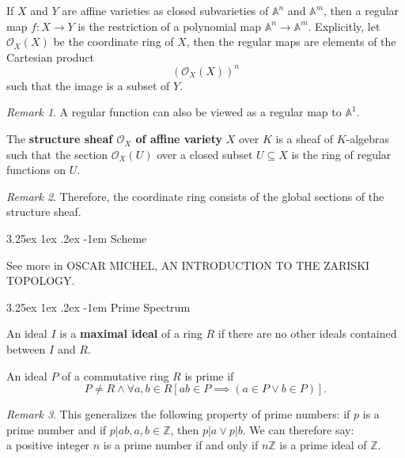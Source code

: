 \documentclass[12pt, letterpaper]{article}
\makeatletter
\renewcommand\subparagraph{\@startsection{subparagraph}{5}{\parindent}%
	{3.25ex \@plus1ex \@minus .2ex}%
	{0.75ex plus 0.1ex}%
	{\normalfont\normalsize\bfseries}}
\newcommand{\inte}{\mathbb{Z}}
\newcommand{\blue}[1]{{\color{blue} #1}}
\renewcommand\paragraph{\@startsection{paragraph}{4}{\z@}%
	{3.25ex \@plus1ex \@minus.2ex}%
	{-1em}%
	{\normalfont\normalsize\bfseries}}
\renewcommand\subparagraph{\@startsection{subparagraph}{5}{\parindent}%
	{3.25ex \@plus1ex \@minus .2ex}%
	{-1em}%
	{\normalfont\normalsize\bfseries}}
\theoremstyle{definition}
\theoremstyle{remark}
\newtheorem*{rem*}{Remark}
\theoremstyle{definition}
\theoremstyle{plain}
\numberwithin{equation}{section}
\makeatother
\begin{document}
	\begin{def*}
		If $X$ and $Y$ are affine varieties as closed subvarieties of
		${\mathbb  {A}}^{n}$ and ${\displaystyle \mathbb {A} ^{m}}$,
		then a regular map $f\colon X\to Y$ is the restriction of
		a polynomial map $\mathbb {A} ^{n}\to \mathbb {A} ^{m}$.
		Explicitly, let $\mathcal{O}_X(X)$ be the coordinate ring of $X$,
		then the regular maps are elements of the Cartesian product
		\[(\mathcal{O}_X(X))^n \]
		such that the image is a subset of $Y$.
	\end{def*}
	\begin{rem*}
		A regular function can also be viewed as a regular map to $\mathbb{A}^1$.
	\end{rem*}

	\begin{def*}
		The \textbf{structure sheaf ${\mathcal {O}}_{X}$ of affine variety} $X$ over $K$ is a sheaf of $K$-algebras
		such that the section ${\mathcal {O}}_{X}(U)$ over a closed subset $U\subseteq X$ is the ring of regular functions on $U$.
	\end{def*}
	\begin{rem*}
		Therefore, the coordinate ring consists of the global sections of the structure sheaf.
	\end{rem*}
	
	\paragraph{Scheme}
	
	See more in \blue{OSCAR MICHEL, AN INTRODUCTION TO THE ZARISKI TOPOLOGY.}
	
	\subparagraph{Prime Spectrum}
	
	
	\begin{def*}
		An ideal $I$ is a \textbf{maximal ideal} of a ring $R$ if there are no other ideals contained between $I$ and $R$.
	\end{def*}

	\begin{def*}
		An ideal $P$ of a commutative ring $R$ is prime if 
		\[ P\ne R \land \forall a,b \in R[ab\in P\implies(a\in P\lor b\in P)]. \]
	\end{def*}
	\begin{rem*}
		This generalizes the following property of prime numbers: if $p$ is a prime number and if $p|ab, a,b\in\inte$, then $p|a\lor p|b$. We can therefore say:\\
		a positive integer $n$ is a prime number if and only if $ n\inte$ is a prime ideal of $\inte$.
	\end{rem*}
\end{document}
